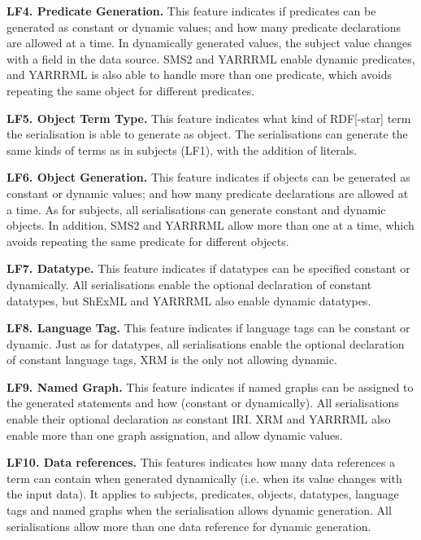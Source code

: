 \textbf{LF4. Predicate Generation.}
This feature indicates if predicates can be generated as constant or dynamic values; and how many predicate declarations are allowed at a time. In dynamically generated values, the subject value changes with a field in the data source. 
SMS2 and YARRRML enable dynamic predicates, and YARRRML is also able to handle more than one predicate, which avoids repeating the same object for different predicates.

\textbf{LF5. Object Term Type.} 
This feature indicates what kind of RDF[-star] term the serialisation is able to generate as object. The serialisations can generate the same kinds of terms as in subjects (LF1), with the addition of literals. 

\textbf{LF6. Object Generation.}
This feature indicates if objects can be generated as constant or dynamic values; and how many predicate declarations are allowed at a time.
As for subjects, all serialisations can generate constant and dynamic objects. In addition, SMS2 and YARRRML allow more than one at a time, which avoids repeating the same predicate for different objects.

\textbf{LF7. Datatype.}
This feature indicates if datatypes can be specified constant or dynamically.
All serialisations enable the optional declaration of constant datatypes, but ShExML and YARRRML also enable dynamic datatypes.

\textbf{LF8. Language Tag.}
This feature indicates if language tags can be constant or dynamic. Just as for datatypes, all serialisations enable the optional declaration of constant language tags, XRM is the only not allowing dynamic.

\textbf{LF9. Named Graph.} 
This feature indicates if named graphs can be assigned to the generated statements and how (constant or dynamically). 
All serialisations enable their optional declaration as constant IRI. XRM and YARRRML also enable more than one graph assignation, and allow dynamic values. 

\textbf{LF10. Data references.} 
This features indicates how many data references a term can contain when generated dynamically (i.e. when its value changes with the input data). It applies to subjects, predicates, objects, datatypes, language tags and named graphs when the serialisation allows dynamic generation. All serialisations allow more than one data reference for dynamic generation.

